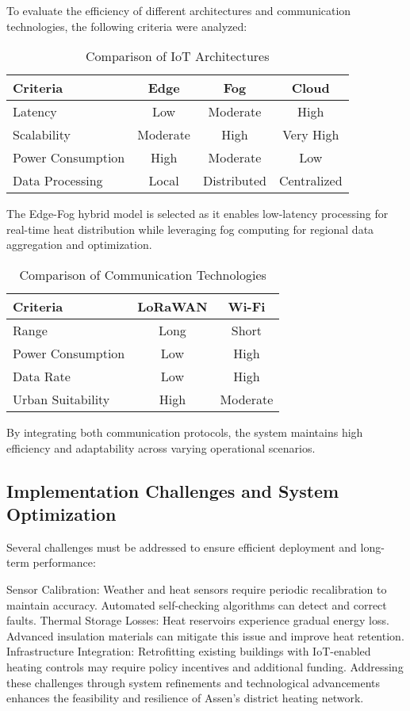 \documentclass[conference]{IEEEtran}
\begin{document}
To evaluate the efficiency of different architectures and communication technologies, the following criteria were analyzed:

\begin{table}[h]
\centering
\caption{Comparison of IoT Architectures}
\begin{tabular}{|l|c|c|c|}
\hline
\textbf{Criteria} & \textbf{Edge} & \textbf{Fog} & \textbf{Cloud} \\
\hline
Latency & Low & Moderate & High \\
Scalability & Moderate & High & Very High \\
Power Consumption & High & Moderate & Low \\
Data Processing & Local & Distributed & Centralized \\
\hline
\end{tabular}
\end{table}

The Edge-Fog hybrid model is selected as it enables low-latency processing for real-time heat distribution while leveraging fog computing for regional data aggregation and optimization.

\begin{table}[h]
\centering
\caption{Comparison of Communication Technologies}
\begin{tabular}{|l|c|c|}
\hline
\textbf{Criteria} & \textbf{LoRaWAN} & \textbf{Wi-Fi} \\
\hline
Range & Long & Short \\
Power Consumption & Low & High \\
Data Rate & Low & High \\
Urban Suitability & High & Moderate \\
\hline
\end{tabular}
\end{table}

By integrating both communication protocols, the system maintains high efficiency and adaptability across varying operational scenarios.

\subsection{Implementation Challenges and System Optimization}

Several challenges must be addressed to ensure efficient deployment and long-term performance:

Sensor Calibration: Weather and heat sensors require periodic recalibration to maintain accuracy. Automated self-checking algorithms can detect and correct faults.
Thermal Storage Losses: Heat reservoirs experience gradual energy loss. Advanced insulation materials can mitigate this issue and improve heat retention.
Infrastructure Integration: Retrofitting existing buildings with IoT-enabled heating controls may require policy incentives and additional funding.
Addressing these challenges through system refinements and technological advancements enhances the feasibility and resilience of Assen’s district heating network.
\end{document}
